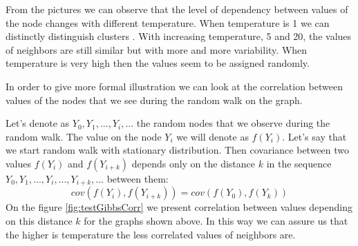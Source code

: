 \documentclass[12pt]{report}
\begin{document}
From the pictures we can observe that the level of dependency between values of the node changes with different temperature. When temperature is 1 we can distinctly distinguish clusters . With increasing temperature, 5 and 20, the values of neighbors are still similar but with more and more variability. When temperature is very high then the values seem to be assigned randomly.

In order to give more formal illustration we can look at the correlation between values of the nodes that we see during the random walk on the graph.

Let's denote as $Y_0, Y_1, ..., Y_i, ...$  the random nodes that we observe during the random walk. The value on the node $Y_i$ we will denote as $f(Y_i)$.  Let's say that we start random walk with stationary distribution. Then covariance between  two values $f(Y_i)$ and $f(Y_{i+k})$ depends only on the distance $k$ in the sequence $Y_0, Y_1, ..., Y_i, ..., Y_{i+k}, ...$ between them:
$$cov(f(Y_i), f(Y_{i+k})) = cov(f(Y_0), f(Y_k))$$
On the figure \ref{fig:testGibbsCorr} we present correlation between values depending on this distance $k$ for the graphs shown above. In this way we can assure us that the higher is temperature the less correlated values of neighbors are.
\end{document}

